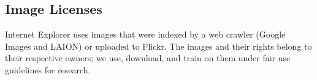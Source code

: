\subsection{Image Licenses}
Internet Explorer uses images that were indexed by a web crawler (Google Images and LAION) or uploaded to Flickr. The images and their rights belong to their respective owners; we use, download, and train on them under fair use guidelines for research. 

